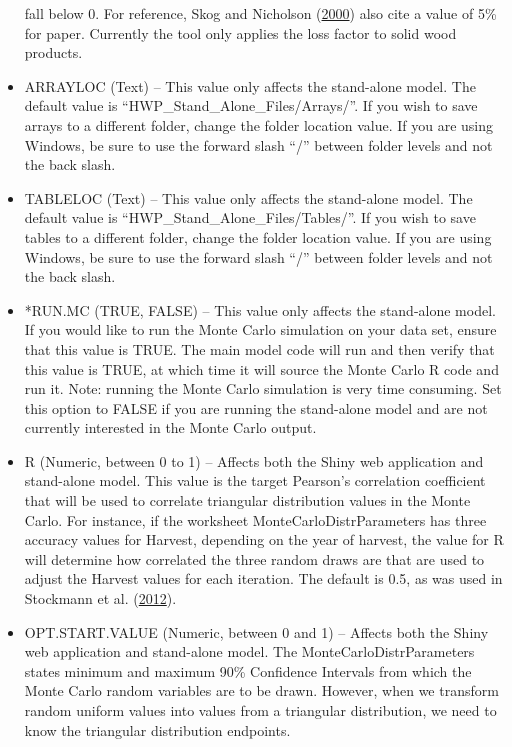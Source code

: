 \documentclass[
  openany]{book}
\begin{document}
\begin{itemize}
  fall below 0. For reference, Skog and Nicholson
  (\protect\hyperlink{ref-skog2000}{2000}) also cite a value of 5\% for
  paper. Currently the tool only applies the loss factor to solid wood
  products.
\item
  ARRAYLOC (Text) -- This value only affects the stand-alone model. The
  default value is ``HWP\_Stand\_Alone\_Files/Arrays/''. If you wish to
  save arrays to a different folder, change the folder location value.
  If you are using Windows, be sure to use the forward slash ``/''
  between folder levels and not the back slash.
\item
  TABLELOC (Text) -- This value only affects the stand-alone model. The
  default value is ``HWP\_Stand\_Alone\_Files/Tables/''. If you wish to
  save tables to a different folder, change the folder location value.
  If you are using Windows, be sure to use the forward slash ``/''
  between folder levels and not the back slash.
\item
  *RUN.MC (TRUE, FALSE) -- This value only affects the stand-alone
  model. If you would like to run the Monte Carlo simulation on your
  data set, ensure that this value is TRUE. The main model code will run
  and then verify that this value is TRUE, at which time it will source
  the Monte Carlo R code and run it. Note: running the Monte Carlo
  simulation is very time consuming. Set this option to FALSE if you are
  running the stand-alone model and are not currently interested in the
  Monte Carlo output.
\item
  R (Numeric, between 0 to 1) -- Affects both the Shiny web application
  and stand-alone model. This value is the target Pearson's correlation
  coefficient that will be used to correlate triangular distribution
  values in the Monte Carlo. For instance, if the worksheet
  MonteCarloDistrParameters has three accuracy values for Harvest,
  depending on the year of harvest, the value for R will determine how
  correlated the three random draws are that are used to adjust the
  Harvest values for each iteration. The default is 0.5, as was used in
  Stockmann et al. (\protect\hyperlink{ref-stockmann2012}{2012}).
\item
  OPT.START.VALUE (Numeric, between 0 and 1) -- Affects both the Shiny
  web application and stand-alone model. The MonteCarloDistrParameters
  states minimum and maximum 90\% Confidence Intervals from which the
  Monte Carlo random variables are to be drawn. However, when we
  transform random uniform values into values from a triangular
  distribution, we need to know the triangular distribution endpoints.

\end{itemize}
\end{document}
